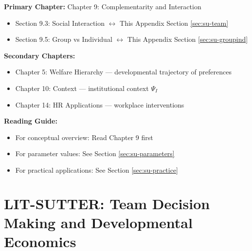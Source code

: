 \begin{tcolorbox}[colback=purple!5!white, colframe=purple!75!black,
    title=Chapter Linkage]

\textbf{Primary Chapter:} Chapter 9: Complementarity and Interaction
\begin{itemize}[nosep]
\item Section 9.3: Social Interaction $\leftrightarrow$ This Appendix Section \ref{sec:su-team}
\item Section 9.5: Group vs Individual $\leftrightarrow$ This Appendix Section \ref{sec:su-groupind}
\end{itemize}

\textbf{Secondary Chapters:}
\begin{itemize}[nosep]
\item Chapter 5: Welfare Hierarchy --- developmental trajectory of preferences
\item Chapter 10: Context --- institutional context $\Psi_I$
\item Chapter 14: HR Applications --- workplace interventions
\end{itemize}

\textbf{Reading Guide:}
\begin{itemize}[nosep]
\item For conceptual overview: Read Chapter 9 first
\item For parameter values: See Section \ref{sec:su-parameters}
\item For practical applications: See Section \ref{sec:su-practice}
\end{itemize}

\end{tcolorbox}


\chapter{LIT-SUTTER: Team Decision Making and Developmental Economics}
\label{app:lit-sutter}

\begin{abstract}
This appendix integrates Matthias Sutter's research into the EBF framework, covering four major themes: (1) team versus individual decision making, (2) developmental trajectory of economic preferences, (3) intergenerational transmission of preferences, and (4) scalable workplace interventions. Sutter's work provides critical evidence for CORE-HOW (complementarity in groups), CORE-WHO (age as welfare dimension), and CORE-WHEN (institutional context). With 90\% Tier-1 evidence quality (18 of 20 papers), this literature offers some of the most robust parameters for LLMMC estimation.
\end{abstract}


